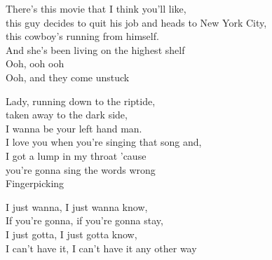 \begin{multicols}{2}


There's this movie that I think you'll like,\\
this guy decides to quit his job and heads to New York City,\\
this cowboy's running from himself.\\
And she's been living on the highest shelf\\

Ooh, ooh ooh\\
Ooh, and they come unstuck\\


Lady, running down to the riptide,\\
taken away to the dark side,\\
I wanna be your left hand man.\\
I love you when you're singing that song and,\\
I got a lump in my throat 'cause\\
you're gonna sing the words wrong\\

Fingerpicking

I just wanna, I just wanna know,\\
If you're gonna, if you're gonna stay,\\
I just gotta, I just gotta know,\\
I can't have it, I can't have it any other way\\


\end{multicols}
